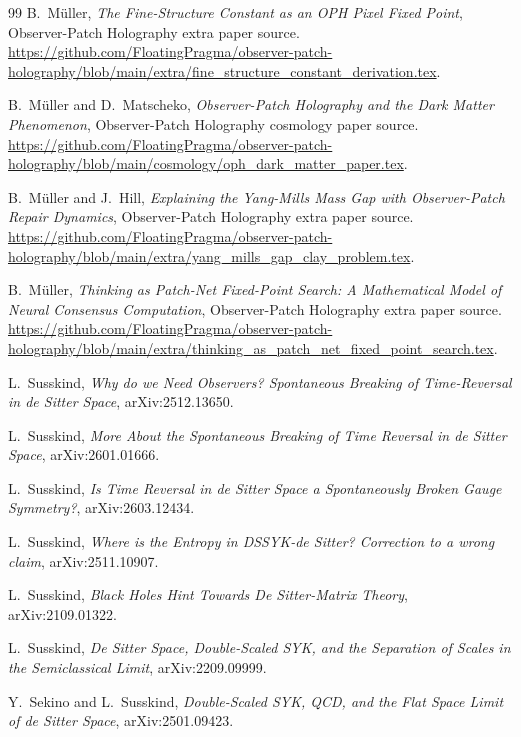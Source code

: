 \documentclass[11pt]{article}
\theoremstyle{remark}
\theoremstyle{plain}
\begin{document}
\begin{thebibliography}{99}
B.\ M\"uller,
\emph{The Fine-Structure Constant as an OPH Pixel Fixed Point},
Observer-Patch Holography extra paper source.
\url{https://github.com/FloatingPragma/observer-patch-holography/blob/main/extra/fine_structure_constant_derivation.tex}.

B.\ M\"uller and D.\ Matscheko,
\emph{Observer-Patch Holography and the Dark Matter Phenomenon},
Observer-Patch Holography cosmology paper source.
\url{https://github.com/FloatingPragma/observer-patch-holography/blob/main/cosmology/oph_dark_matter_paper.tex}.

B.\ M\"uller and J.\ Hill,
\emph{Explaining the Yang-Mills Mass Gap with Observer-Patch Repair Dynamics},
Observer-Patch Holography extra paper source.
\url{https://github.com/FloatingPragma/observer-patch-holography/blob/main/extra/yang_mills_gap_clay_problem.tex}.

B.\ M\"uller,
\emph{Thinking as Patch-Net Fixed-Point Search: A Mathematical Model of Neural Consensus Computation},
Observer-Patch Holography extra paper source.
\url{https://github.com/FloatingPragma/observer-patch-holography/blob/main/extra/thinking_as_patch_net_fixed_point_search.tex}.

L.\ Susskind,
\emph{Why do we Need Observers? Spontaneous Breaking of Time-Reversal in de Sitter Space},
arXiv:2512.13650.

L.\ Susskind,
\emph{More About the Spontaneous Breaking of Time Reversal in de Sitter Space},
arXiv:2601.01666.

L.\ Susskind,
\emph{Is Time Reversal in de Sitter Space a Spontaneously Broken Gauge Symmetry?},
arXiv:2603.12434.

L.\ Susskind,
\emph{Where is the Entropy in DSSYK-de Sitter? Correction to a wrong claim},
arXiv:2511.10907.

L.\ Susskind,
\emph{Black Holes Hint Towards De Sitter-Matrix Theory},
arXiv:2109.01322.

L.\ Susskind,
\emph{De Sitter Space, Double-Scaled SYK, and the Separation of Scales in the Semiclassical Limit},
arXiv:2209.09999.

Y.\ Sekino and L.\ Susskind,
\emph{Double-Scaled SYK, QCD, and the Flat Space Limit of de Sitter Space},
arXiv:2501.09423.


\end{thebibliography}
\end{document}
